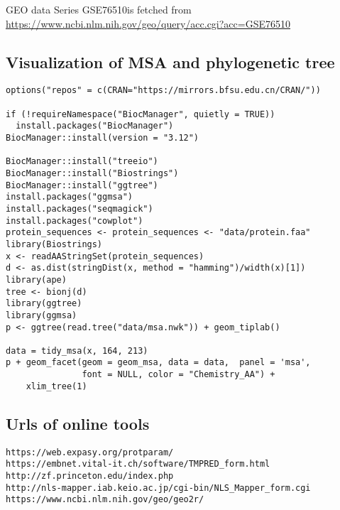 GEO data Series GSE76510is fetched from \url{https://www.ncbi.nlm.nih.gov/geo/query/acc.cgi?acc=GSE76510}

\subsection*{Visualization of MSA and phylogenetic tree}
\begin{lstlisting}[basicstyle=\tiny\ttfamily]
options("repos" = c(CRAN="https://mirrors.bfsu.edu.cn/CRAN/"))

if (!requireNamespace("BiocManager", quietly = TRUE))
  install.packages("BiocManager")
BiocManager::install(version = "3.12")

BiocManager::install("treeio")
BiocManager::install("Biostrings")
BiocManager::install("ggtree")
install.packages("ggmsa")
install.packages("seqmagick")
install.packages("cowplot")
protein_sequences <- protein_sequences <- "data/protein.faa"
library(Biostrings)
x <- readAAStringSet(protein_sequences)
d <- as.dist(stringDist(x, method = "hamming")/width(x)[1])
library(ape)
tree <- bionj(d)
library(ggtree)
library(ggmsa)
p <- ggtree(read.tree("data/msa.nwk")) + geom_tiplab()

data = tidy_msa(x, 164, 213)
p + geom_facet(geom = geom_msa, data = data,  panel = 'msa',
               font = NULL, color = "Chemistry_AA") +
    xlim_tree(1)
\end{lstlisting}

\subsection*{Urls of online tools}
\begin{lstlisting}[basicstyle=\tiny\ttfamily]
https://web.expasy.org/protparam/
https://embnet.vital-it.ch/software/TMPRED_form.html
http://zf.princeton.edu/index.php
http://nls-mapper.iab.keio.ac.jp/cgi-bin/NLS_Mapper_form.cgi
https://www.ncbi.nlm.nih.gov/geo/geo2r/
\end{lstlisting}
